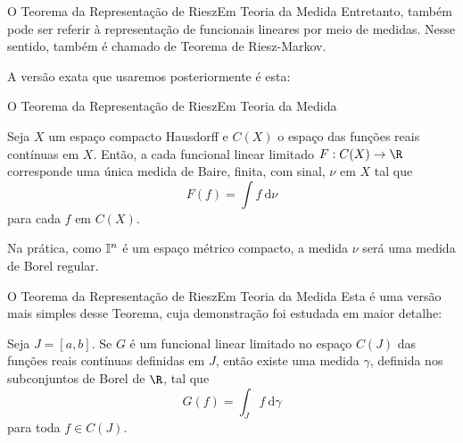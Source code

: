 \documentclass[13pt]{beamer}
\begin{document}
\begin{frame}{O Teorema da Representação de Riesz}{Em Teoria da Medida}
    Entretanto, também pode ser referir à representação de funcionais lineares por meio de medidas.
    Nesse sentido, também é chamado de Teorema de Riesz-Markov.

    A versão exata que usaremos posteriormente é esta:
\end{frame}

\begin{frame}{O Teorema da Representação de Riesz}{Em Teoria da Medida}
    \begin{teo*}
        Seja \( X \) um espaço compacto Hausdorff e \( C ( X ) \) o espaço das funções reais contínuas em \( X \).
        Então, a cada funcional linear limitado \( F : C ( X ) \to \R \) corresponde uma única medida de Baire, finita, com sinal, \( \nu \) em \( X \) tal que
        \begin{equation*}
            F ( f ) = \int f \ \mathrm{d} \nu
        \end{equation*}
        para cada \( f \) em \( C ( X ) \).
    \end{teo*}
    Na prática, como \( \mathbb{I}^{ n } \) é um espaço métrico compacto, a medida \( \nu \) será uma medida de Borel regular.
\end{frame}

\begin{frame}{O Teorema da Representação de Riesz}{Em Teoria da Medida}
    Esta é uma versão mais simples desse Teorema, cuja demonstração foi estudada em maior detalhe:
    \begin{teo*}
        Seja \( J = [a, b] \).
        Se \( G \) é um funcional linear limitado no espaço \( C ( J ) \) das funções reais contínuas definidas em \( J \), então existe uma medida \( \gamma \), definida nos subconjuntos de Borel de \( \R \), tal que
        \begin{equation*}
            G ( f ) = \int_{ J } f \ \mathrm{d} \gamma
        \end{equation*}
        para toda \( f \in C ( J ) \).
    \end{teo*}
\end{frame}


\end{document}

